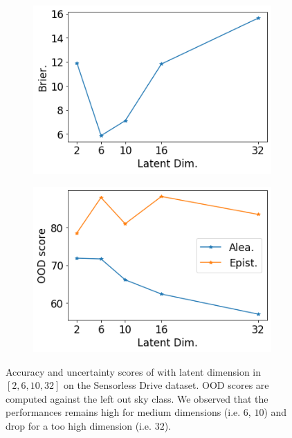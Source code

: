 \begin{figure}[ht]
    \begin{subfigure}[t]{0.33 \textwidth}
        \centering
        \includegraphics[width=1. \textwidth]{sections/006_neurips2020/figures/lat_dim_sen_brier.png}
    \end{subfigure}%
    \begin{subfigure}[t]{0.33 \textwidth}
        \centering
        \includegraphics[width=1. \textwidth]{sections/006_neurips2020/figures/lat_dim_sen_ood.png}
    \end{subfigure}%

    \caption{Accuracy and uncertainty scores of \oursacro with latent dimension in $[2, 6, 10, 32]$ on the Sensorless Drive dataset. OOD scores are computed against the left out sky class. We observed that the performances remains high for medium dimensions (i.e. $6$, $10$) and drop for a too high dimension (i.e. $32$).}
    \label{fig:latent_dim_sensorless_drive}
\end{figure}

